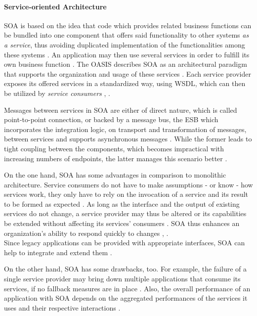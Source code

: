 \paragraph{Service-oriented Architecture} %
\label{par:service_oriented_architecture}
\ac{SOA} is based on the idea that code which provides related business functions can be bundled into one component that offers said functionality to other systems \emph{as a service}, thus avoiding duplicated implementation of the functionalities among these systems \cite[p.8]{Hohpe2004Enterprise}.
An application may then use several services in order to fulfill its own business function \cite[p.~390]{Papazoglou2007Service}.
The \ac{OASIS} describes \ac{SOA} as an architectural paradigm that supports the organization and usage of these services \cite{Standards2006Reference}. Each service provider exposes its offered services in a standardized way, \eg using \ac{WSDL}, which can then be utilized by \emph{service consumers} \cite[p.~390]{Papazoglou2007Service}, \cite[p.~17]{Strimbei2015Software}.

Messages between services in \ac{SOA} are either of direct nature, which is called point-to-point connection, or backed by a message bus, the \ac{ESB} which incorporates the integration logic, \eg on transport and transformation of messages, between services and supports asynchronous messages \cite[p.~393]{Papazoglou2007Service}. While the former leads to tight coupling between the components, which becomes impractical with increasing numbers of endpoints, the latter manages this scenario better \cite[p.~393]{Papazoglou2007Service}.

On the one hand, \ac{SOA} has some advantages in comparison to monolithic architecture.
Service consumers do not have to make assumptions - or know - how services work, they only have to rely on the invocation of a service and its result to be formed as expected \cite[p.~390]{Papazoglou2007Service}. As long as the interface and the output of existing services do not change, a service provider may thus be altered or its capabilities be extended without affecting its services' consumers \cite[p.~390]{Papazoglou2007Service}. \ac{SOA} thus enhances an organization’s ability to respond quickly to changes \cite[p.~390]{Papazoglou2007Service}, \cite[p.~254]{Choi2010Implementing}. \\
Since legacy applications can be provided with appropriate interfaces, SOA can help to integrate and extend them \cite[p.~390]{Papazoglou2007Service}.

On the other hand, \ac{SOA} has some drawbacks, too.
For example, the failure of a single service provider may bring down multiple applications that consume its services, if no fallback measures are in place \cite[p.~408f]{Papazoglou2007Service}.
Also, the overall performance of an application with \ac{SOA} depends on the aggregated performances of the services it uses and their respective interactions \cite[p.~408f]{Papazoglou2007Service}.

